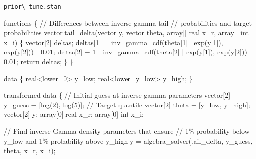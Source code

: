 \documentclass[
  letterpaper,
  DIV=11,
  numbers=noendperiod]{scrartcl}
\newenvironment{Shaded}{\begin{snugshade}}{\end{snugshade}}
\newcommand{\CommentTok}[1]{\textcolor[rgb]{0.37,0.37,0.37}{#1}}
\newcommand{\ControlFlowTok}[1]{\textcolor[rgb]{0.00,0.23,0.31}{#1}}
\newcommand{\DataTypeTok}[1]{\textcolor[rgb]{0.68,0.00,0.00}{#1}}
\newcommand{\DecValTok}[1]{\textcolor[rgb]{0.68,0.00,0.00}{#1}}
\newcommand{\FloatTok}[1]{\textcolor[rgb]{0.68,0.00,0.00}{#1}}
\newcommand{\KeywordTok}[1]{\textcolor[rgb]{0.00,0.23,0.31}{#1}}
\newcommand{\NormalTok}[1]{\textcolor[rgb]{0.00,0.23,0.31}{#1}}
\begin{document}
\begin{codelisting}

\caption{\texttt{prior\textbackslash\_tune.stan}}

\begin{Shaded}
\begin{Highlighting}[]
\KeywordTok{functions}\NormalTok{ \{}
  \CommentTok{// Differences between inverse gamma tail}
  \CommentTok{// probabilities and target probabilities}
  \DataTypeTok{vector}\NormalTok{ tail\_delta(}\DataTypeTok{vector}\NormalTok{ y, }\DataTypeTok{vector}\NormalTok{ theta,}
                    \DataTypeTok{array}\NormalTok{[] }\DataTypeTok{real}\NormalTok{ x\_r, }\DataTypeTok{array}\NormalTok{[] }\DataTypeTok{int}\NormalTok{ x\_i) \{}
    \DataTypeTok{vector}\NormalTok{[}\DecValTok{2}\NormalTok{] deltas;}
\NormalTok{    deltas[}\DecValTok{1}\NormalTok{] = inv\_gamma\_cdf(theta[}\DecValTok{1}\NormalTok{] | exp(y[}\DecValTok{1}\NormalTok{]), exp(y[}\DecValTok{2}\NormalTok{])) {-} }\FloatTok{0.01}\NormalTok{;}
\NormalTok{    deltas[}\DecValTok{2}\NormalTok{] = }\DecValTok{1}\NormalTok{ {-} inv\_gamma\_cdf(theta[}\DecValTok{2}\NormalTok{] | exp(y[}\DecValTok{1}\NormalTok{]), exp(y[}\DecValTok{2}\NormalTok{])) {-} }\FloatTok{0.01}\NormalTok{;}
    \ControlFlowTok{return}\NormalTok{ deltas;}
\NormalTok{  \}}
\NormalTok{\}}

\KeywordTok{data}\NormalTok{ \{}
  \DataTypeTok{real}\NormalTok{\textless{}}\KeywordTok{lower}\NormalTok{=}\DecValTok{0}\NormalTok{\textgreater{}     y\_low;}
  \DataTypeTok{real}\NormalTok{\textless{}}\KeywordTok{lower}\NormalTok{=y\_low\textgreater{} y\_high;}
\NormalTok{\}}

\KeywordTok{transformed data}\NormalTok{ \{}
  \CommentTok{// Initial guess at inverse gamma parameters}
  \DataTypeTok{vector}\NormalTok{[}\DecValTok{2}\NormalTok{] y\_guess = [log(}\DecValTok{2}\NormalTok{), log(}\DecValTok{5}\NormalTok{)]\textquotesingle{};}
  \CommentTok{// Target quantile}
  \DataTypeTok{vector}\NormalTok{[}\DecValTok{2}\NormalTok{] theta = [y\_low, y\_high]\textquotesingle{};}
  \DataTypeTok{vector}\NormalTok{[}\DecValTok{2}\NormalTok{] y;}
  \DataTypeTok{array}\NormalTok{[}\DecValTok{0}\NormalTok{] }\DataTypeTok{real}\NormalTok{ x\_r;}
  \DataTypeTok{array}\NormalTok{[}\DecValTok{0}\NormalTok{] }\DataTypeTok{int}\NormalTok{ x\_i;}

  \CommentTok{// Find inverse Gamma density parameters that ensure }
  \CommentTok{// 1\% probability below y\_low and 1\% probability above y\_high}
\NormalTok{  y = }\KeywordTok{algebra\_solver}\NormalTok{(tail\_delta, y\_guess, theta, x\_r, x\_i);}


\end{Highlighting}
\end{Shaded}
\end{codelisting}
\end{document}
